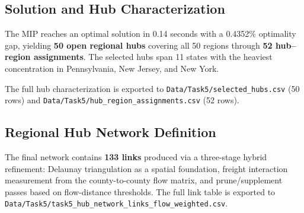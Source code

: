 \subsection{Solution and Hub Characterization}

The MIP reaches an optimal solution in 0.14 seconds with a 0.4352\% optimality gap, yielding \textbf{50 open regional hubs} covering all 50 regions through \textbf{52 hub--region assignments}. The selected hubs span 11 states with the heaviest concentration in Pennsylvania, New Jersey, and New York.

The full hub characterization is exported to \texttt{Data/Task5/selected\_hubs.csv} (50 rows) and \texttt{Data/Task5/hub\_region\_assignments.csv} (52 rows).

\subsection{Regional Hub Network Definition}

The final network contains \textbf{133 links} produced via a three-stage hybrid refinement: Delaunay triangulation as a spatial foundation, freight interaction measurement from the county-to-county flow matrix, and prune/supplement passes based on flow-distance thresholds. The full link table is exported to \texttt{Data/Task5/task5\_hub\_network\_links\_flow\_weighted.csv}.

